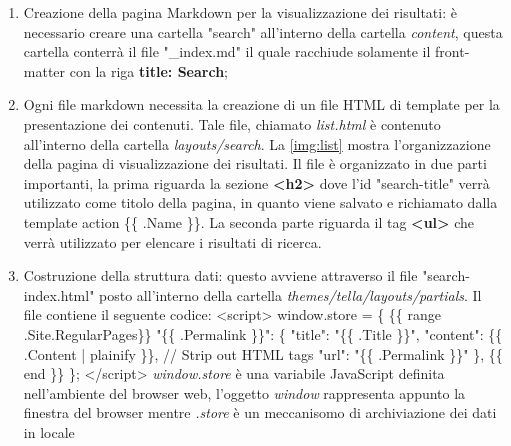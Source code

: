 \documentclass[target=bach,aauheader=]{thud}
\begin{document}
\begin{enumerate}
    \item Creazione della pagina Markdown per la visualizzazione dei risultati: è necessario creare una cartella "search" all'interno della cartella \textit{content}, questa cartella conterrà il file "\_index.md" il quale racchiude solamente il front-matter con la riga \textbf{{\selectfont title: Search}};
    \item Ogni file markdown necessita la creazione di un file HTML di template per la presentazione dei contenuti. Tale file, chiamato \textit{list.html} è contenuto all'interno della cartella \textit{layouts/search}.
    \newline \newline
    La \cref{img:list} mostra l'organizzazione della pagina di visualizzazione dei risultati. Il file è organizzato in due parti importanti, la prima riguarda la sezione \textbf{<h2>} dove l'id "search-title" verrà utilizzato come titolo della pagina, in quanto viene salvato e richiamato dalla template action \{\{ .Name \}\}. 
    La seconda parte riguarda il tag \textbf{<ul>} che verrà utilizzato per elencare i risultati di ricerca.
    \item Costruzione della struttura dati: questo avviene attraverso il file "search-index.html" posto all'interno della cartella \textit{themes/tella/layouts/partials}. Il file contiene il seguente codice:
    \newline \newline <script> 
    \newline window.store = \{ 
        \newline \{\{ range .Site.RegularPages\}\}
        \newline "\{\{ .Permalink \}\}": \{
        \newline    "title": "\{\{ .Title  \}\}",
        \newline    "content": \{\{ .Content | plainify \}\}, // Strip out HTML tags
        \newline    "url": "\{\{ .Permalink \}\}"
        \newline \},
        \newline \{\{ end \}\}
    \newline \};
    \newline </script>
    \newline \newline
    \textit{window.store} è una variabile JavaScript definita nell'ambiente del browser web, l'oggetto \textit{window} rappresenta appunto la finestra del browser mentre \textit{.store} è un meccanisomo di archiviazione dei dati in locale 

\end{enumerate}
\end{document}

